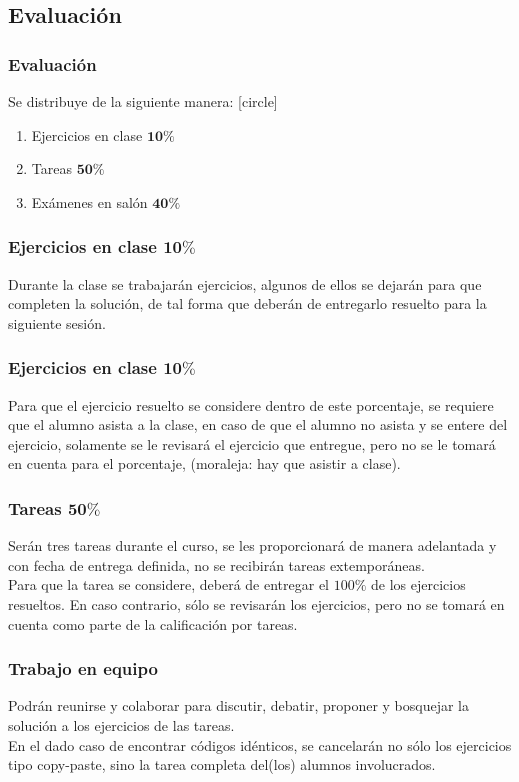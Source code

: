 \subsection{Evaluación}
\begin{frame}
\frametitle{Evaluación}
Se distribuye de la siguiente manera:
[circle]
\begin{enumerate}[<+->]
\item Ejercicios en clase $\mathbf{10\%}$
\item Tareas $\mathbf{50\%}$
\item Exámenes en salón $\mathbf{40\%}$
\end{enumerate}
\end{frame}
\begin{frame}
\frametitle{Ejercicios en clase $\mathbf{10\%}$}
Durante la clase se trabajarán ejercicios, algunos de ellos se dejarán para que completen la solución, de tal forma que deberán de entregarlo resuelto para la siguiente sesión.
\end{frame}
\begin{frame}
\frametitle{Ejercicios en clase $\mathbf{10\%}$}
Para que el ejercicio resuelto se considere dentro de este porcentaje, se requiere que el alumno asista a la clase, en caso de que el alumno no asista y se entere del ejercicio, solamente se le revisará el ejercicio que entregue, pero no se le tomará en cuenta para el porcentaje, (moraleja: hay que asistir a clase).
\end{frame}
\begin{frame}
\frametitle{Tareas $\mathbf{50\%}$}
Serán tres tareas durante el curso, se les proporcionará de manera adelantada y con fecha de entrega definida, no se recibirán tareas extemporáneas. 
\\
\bigskip
\pause
Para que la tarea se considere, deberá de entregar el $100\%$ de los ejercicios resueltos. En caso contrario, sólo se revisarán los ejercicios, pero no se tomará en cuenta como parte de la calificación por tareas.
\end{frame}
\begin{frame}
\frametitle{Trabajo en equipo}
Podrán reunirse y colaborar para discutir, debatir, proponer y bosquejar la solución a los ejercicios de las tareas.
\\
\bigskip
En el dado caso de encontrar códigos idénticos, se cancelarán no sólo los ejercicios tipo copy-paste, sino la tarea completa del(los) alumnos involucrados.
\end{frame}
